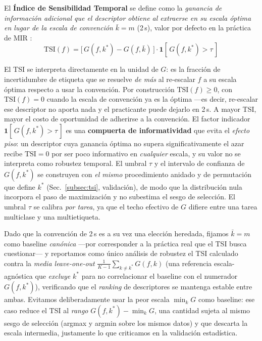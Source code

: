 \documentclass[conference]{IEEEtran}
\begin{document}
El \textbf{Índice de Sensibilidad Temporal} se define como la \emph{ganancia de información adicional que el descriptor obtiene al extraerse en su escala óptima en lugar de la escala de convención} $\bar{k}=m$ (2\,s), valor por defecto en la práctica de MIR \cite{peeters2004large}:
\begin{equation}
    \mathrm{TSI}(f) = \bigl[\,G(f,k^*) - G(f,\bar{k})\,\bigr]\cdot
    \mathbf{1}\!\left[\,G(f,k^*) > \tau\,\right]
\label{eq:tsi}
\end{equation}

El TSI se interpreta directamente en la unidad de $G$: es la fracción de incertidumbre de etiqueta que se resuelve \emph{de más} al re-escalar $f$ a su escala óptima respecto a usar la convención. Por construcción $\mathrm{TSI}(f)\geq 0$, con $\mathrm{TSI}(f)=0$ cuando la escala de convención ya es la óptima ---es decir, re-escalar ese descriptor no aporta nada y el practicante puede dejarlo en 2\,s. A mayor TSI, mayor el costo de oportunidad de adherirse a la convención. El factor indicador $\mathbf{1}[\,G(f,k^*)>\tau\,]$ es una \textbf{compuerta de informatividad} que evita el \emph{efecto piso}: un descriptor cuya ganancia óptima no supera significativamente el azar recibe $\mathrm{TSI}=0$ por ser poco informativo en \emph{cualquier} escala, y su valor no se interpreta como robustez temporal. El umbral $\tau$ y el intervalo de confianza de $G(f,k^*)$ se construyen con \emph{el mismo} procedimiento anidado y de permutación que define $k^*$ (Sec.~\ref{subsec:tsi}, validación), de modo que la distribución nula incorpora el paso de maximización y no subestima el sesgo de selección. El umbral $\tau$ se calibra \emph{por tarea}, ya que el techo efectivo de $G$ difiere entre una tarea multiclase y una multietiqueta.


Dado que la convención de 2\,s es a su vez una elección heredada, fijamos $\bar k=m$ como baseline \emph{canónica} ---por corresponder a la práctica real que el TSI busca cuestionar--- y reportamos como único análisis de robustez el TSI calculado contra la \emph{media \mbox{leave-one-out}} $\tfrac{1}{K-1}\sum_{k\neq k^*} G(f,k)$ (una referencia escala-agnóstica que \emph{excluye} $k^*$ para no correlacionar el baseline con el numerador $G(f,k^*)$), verificando que el \emph{ranking} de descriptores se mantenga estable entre ambas. Evitamos deliberadamente usar la peor escala $\min_k G$ como baseline: ese caso reduce el TSI al \emph{rango} $G(f,k^*)-\min_k G$, una cantidad sujeta al mismo sesgo de selección (argmax y argmin sobre los mismos datos) y que descarta la escala intermedia, justamente lo que criticamos en la validación estadística.
\end{document}
